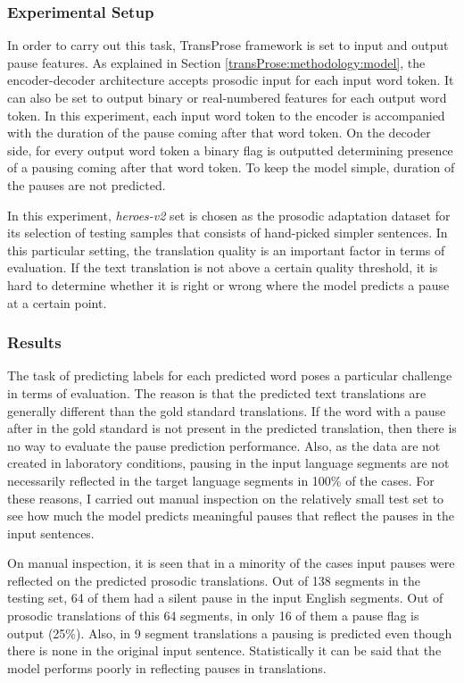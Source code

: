 \subsubsection{Experimental Setup}

In order to carry out this task, TransProse framework is set to input and output pause features. As explained in Section \ref{transProse:methodology:model}, the encoder-decoder architecture accepts prosodic input for each input word token. It can also be set to output binary or real-numbered features for each output word token. In this experiment, each input word token to the encoder is accompanied with the duration of the pause coming after that word token. On the decoder side, for every output word token a binary flag is outputted determining presence of a pausing coming after that word token. To keep the model simple, duration of the pauses are not predicted.

In this experiment, \textit{heroes-v2} set is chosen as the prosodic adaptation dataset for its selection of testing samples that consists of hand-picked simpler sentences. In this particular setting, the translation quality is an important factor in terms of evaluation. If the text translation is not above a certain quality threshold, it is hard to determine whether it is right or wrong where the model predicts a pause at a certain point. 

\subsubsection{Results}
The task of predicting labels for each predicted word poses a particular challenge in terms of evaluation. The reason is that the predicted text translations are generally different than the gold standard translations. If the word with a pause after in the gold standard is not present in the predicted translation, then there is no way to evaluate the pause prediction performance. Also, as the data are not created in laboratory conditions, pausing in the input language segments are not necessarily reflected in the target language segments in 100\% of the cases. For these reasons, I carried out manual inspection on the relatively small test set to see how much the model predicts meaningful pauses that reflect the pauses in the input sentences. 

On manual inspection, it is seen that in a minority of the cases input pauses were reflected on the predicted prosodic translations. Out of 138 segments in the testing set, 64 of them had a silent pause in the input English segments. Out of prosodic translations of this 64 segments, in only 16 of them a pause flag is output (25\%). Also, in 9 segment translations a pausing is predicted even though there is none in the original input sentence. Statistically it can be said that the model performs poorly in reflecting pauses in translations. 

